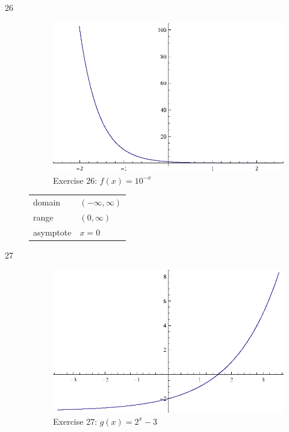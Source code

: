 \documentclass{exam}
\begin{document}
\begin{description}
      \pagebreak

      \item[26] 
        \begin{figure}[H]
          \centering
          \includegraphics[scale=1.0]{exercise26.eps}
          \caption*{Exercise 26: $f(x) = 10^{-x}$}
        \end{figure}

        \begin{tabular}[H]{ll}
          \toprule
          domain    & $(-\infty, \infty)$ \\
          range     & $(0, \infty)$ \\
          asymptote & $x = 0$ \\
          \bottomrule
        \end{tabular}

      \item[27] 
        \begin{figure}[H]
          \centering
          \includegraphics[scale=1.0]{exercise27.eps}
          \caption*{Exercise 27: $g(x) = 2^x - 3$}
        \end{figure}


\end{description}
\end{document}
